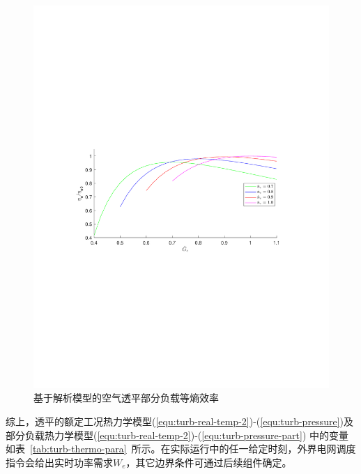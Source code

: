 \begin{figure}[H] %
  \centering
  \includegraphics[scale=0.65]{figures/Chap2-3-Turb-Eff-part-load.pdf}
  \caption{基于解析模型的空气透平部分负载等熵效率}
  \label{fig:Turb-Eff-part-load}
\end{figure}

综上，透平的额定工况热力学模型(\ref{equ:turb-real-temp-2})-(\ref{equ:turb-pressure})及部分负载热力学模型(\ref{equ:turb-real-temp-2})-(\ref{equ:turb-pressure-part}) 中的变量如表~\ref{tab:turb-thermo-para}~所示。在实际运行中的任一给定时刻，外界电网调度指令会给出实时功率需求$W_e$，其它边界条件可通过后续组件确定。

